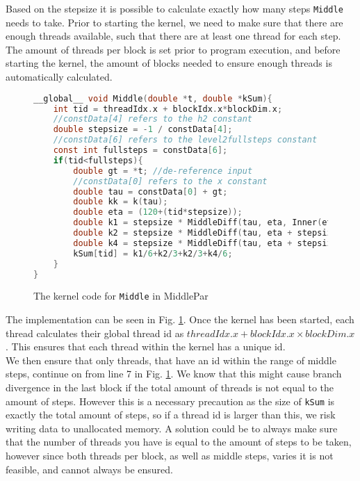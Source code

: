 Based on the stepsize it is possible to calculate exactly how many steps \texttt{Middle} needs to take. Prior to starting the kernel, we need to make sure that there are enough threads available, such that there are at least one thread for each step. The amount of threads per block is set prior to program execution, and before starting the kernel, the amount of blocks needed to ensure enough threads is automatically calculated.\\

\begin{figure}[H]
\begin{lstlisting}[language=c]
__global__ void Middle(double *t, double *kSum){
	int tid = threadIdx.x + blockIdx.x*blockDim.x;
	//constData[4] refers to the h2 constant
	double stepsize = -1 / constData[4]; 
	//constData[6] refers to the level2fullsteps constant
	const int fullsteps = constData[6]; 
	if(tid<fullsteps){
		double gt = *t; //de-reference input
		//constData[0] refers to the x constant
		double tau = constData[0] + gt; 
		double kk = k(tau);
		double eta = (120+(tid*stepsize));
		double k1 = stepsize * MiddleDiff(tau, eta, Inner(eta, gt, kk).y);
		double k2 = stepsize * MiddleDiff(tau, eta + stepsize/2, Inner(eta + stepsize/2, gt, kk).y);		
		double k4 = stepsize * MiddleDiff(tau, eta + stepsize, Inner(eta + stepsize, gt, kk).y);
		kSum[tid] = k1/6+k2/3+k2/3+k4/6;
	}
}
\end{lstlisting}
\caption{The kernel code for \texttt{Middle} in MiddlePar}
\label{fig:middlepar}
\end{figure}

The implementation can be seen in Fig. \ref{fig:middlepar}. Once the kernel has been started, each thread calculates their global thread id as $threadIdx.x + blockIdx.x \times blockDim.x$. This ensures that each thread within the kernel has a unique id.\\

We then ensure that only threads, that have an id within the range of middle steps, continue on from line 7 in Fig. \ref{fig:middlepar}. We know that this might cause branch divergence in the last block if the total amount of threads is not equal to the amount of steps. However this is a necessary precaution as the size of \texttt{kSum} is exactly the total amount of steps, so if a thread id is larger than this, we risk writing data to unallocated memory. A solution could be to always make sure that the number of threads you have is equal to the amount of steps to be taken, however since both threads per block, as well as middle steps, varies it is not feasible, and cannot always be ensured.\\

